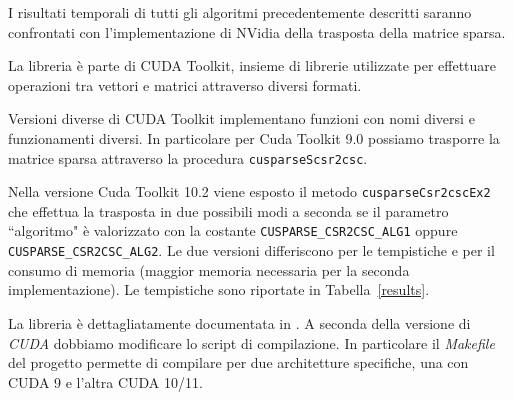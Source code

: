 I risultati temporali di tutti gli algoritmi precedentemente descritti saranno confrontati con l'implementazione di NVidia della trasposta della matrice sparsa. 

La libreria \cuSPARSE{} è parte di \textrm{CUDA Toolkit}, insieme di librerie utilizzate per effettuare operazioni tra vettori e matrici attraverso diversi formati. 

Versioni diverse di \textrm{CUDA Toolkit} implementano funzioni con nomi diversi e funzionamenti diversi. In particolare per \textrm{Cuda Toolkit 9.0} possiamo trasporre la matrice sparsa attraverso la procedura \texttt{cusparseScsr2csc}.

Nella versione \textrm{Cuda Toolkit 10.2} viene esposto il metodo \texttt{cusparseCsr2cscEx2} che effettua la trasposta in due possibili modi a seconda se il parametro ``algoritmo" è valorizzato con la costante \texttt{CUSPARSE\_CSR2CSC\_ALG1} oppure \texttt{CUSPARSE\_CSR2CSC\_ALG2}. Le due versioni differiscono per le tempistiche e per il consumo di memoria (maggior memoria necessaria per la seconda implementazione). Le tempistiche sono riportate in Tabella~\ref{results}.

La libreria è dettagliatamente documentata in \cite{cusparse}. A seconda della versione di \emph{CUDA} dobbiamo modificare lo script di compilazione. In particolare il \emph{Makefile} del progetto permette di compilare per due architetture specifiche, una con CUDA 9 e l'altra CUDA 10/11. 